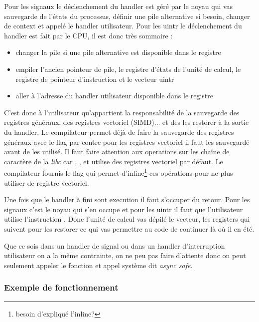 Pour les signaux le déclenchement du handler est géré par le noyau qui vas sauvegarde de l'états du processus, définir une pile alternative si besoin, changer de context et appelé le handler utilisateur.
Pour les uintr le déclenchement du handler est fait par le CPU, il est donc très sommaire :
\begin{itemize}
  \item changer la pile si une pile alternative est disponible dans le registre 
  \item empiler l'ancien pointeur de pile, le registre d'états de l'unité de calcul, le registre de pointeur d'instruction  et le vecteur uintr
  \item aller à l'adresse du handler utilisateur disponible dans le registre\\
\end{itemize}
C'est donc à l'utilisateur qu'appartient la responsabilité de la sauvegarde des registres généraux, des registres vectoriel (SIMD)... et des les restorer à la sortie du handler.
Le compilateur permet déjà de faire la sauvegarde des registres généraux avec le flag  par-contre pour les registres vectoriel il faut les sauvegardé avant de les utilisé.
Il faut faire attention aux operations sur les chaîne de caractère de la \emph{libc} car , ,  et  utilise des registres vectoriel par défaut.
Le compilateur fournis le flag  qui permet d'inline\footnote{besoin d'expliqué l'inline?} ces opérations pour ne plus utiliser de registre vectoriel.

Une fois que le handler à fini sont execution il faut s'occuper du retour. Pour les signaux c'est le noyau qui s'en occupe et pour les uintr il faut que l'utilisateur utilise l'instruction .
Donc l'unité de calcul vas dépilé le vecteur, les registers qui suivent pour les restorer ce qui vas permettre au code de continuer là où il en été.

Que ce sois dans un handler de signal ou dans un handler d'interruption utilisateur on a la même contrainte, on ne peu pas faire d'attente donc on peut seulement appeler le fonction et appel système dit \emph{async safe}.

\subsubsection{Exemple de fonctionnement}
\label{sec:exemple}

